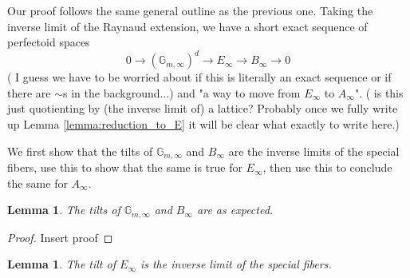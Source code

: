 \documentclass[11pt,oneside]{amsart}
\theoremstyle{theorem}
\newtheorem{lemma}[theorem]{Lemma}
\theoremstyle{definition}
\theoremstyle{remark}
\begin{document}
Our proof follows the same general outline as the previous one. Taking the inverse limit of the Raynaud extension, we have a short exact sequence of perfectoid spaces
$$ 0\rightarrow (\mathbb G_{m,\infty})^d\rightarrow E_\infty \rightarrow B_\infty\rightarrow 0$$ ({\color{purple} I guess we have to be worried about if this is literally an exact sequence or if there are $\sim$s in the background...}) and "a way to move from $E_\infty$ to $A_\infty$". ({\color{purple} is this just quotienting by (the inverse limit of) a lattice? Probably once we fully write up Lemma \ref{lemma:reduction_to_E} it will be clear what exactly to write here}.) 

We first show that the tilts of $\mathbb G_{m,\infty}$ and $B_\infty$ are the inverse limits of the special fibers, use this to show that the same is true for $E_\infty$, then use this to conclude the same for $A_\infty$.

\begin{lemma}\label{lemma:GB_tilt}
The tilts of $\mathbb G_{m,\infty}$ and $B_\infty$ are as expected.
\end{lemma}

\begin{proof}
{\color{purple} Insert proof}
\end{proof}

\begin{lemma}\label{lemma:E_tilt}
The tilt of $E_\infty$ is the inverse limit of the special fibers.
\end{lemma}
\end{document}
